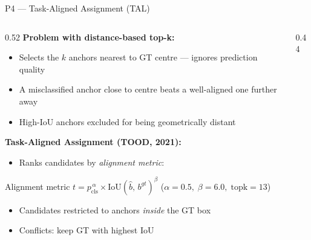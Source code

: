 \documentclass[aspectratio=169, 10pt]{beamer}
\begin{document}
\begin{frame}{P4 — Task-Aligned Assignment (TAL)}
  \begin{columns}[T]
    \begin{column}{0.52\textwidth}
      \textbf{Problem with distance-based top-k:}
      \begin{itemize}\small
        \item Selects the $k$ anchors nearest to GT centre — ignores prediction quality
        \item A misclassified anchor close to centre beats a well-aligned one further away
        \item High-IoU anchors excluded for being geometrically distant
      \end{itemize}

      \vspace{5pt}
      \textbf{Task-Aligned Assignment (TOOD, 2021):}
      \begin{itemize}\small
        \item Ranks candidates by \emph{alignment metric}:
      \end{itemize}
      \begin{block}{\small Alignment metric}
        \small
        $t = p_{\mathrm{cls}}^{\,\alpha} \times \mathrm{IoU}(\hat{b},\,b^{gt})^{\beta}$
        \;\scriptsize ($\alpha{=}0.5,\;\beta{=}6.0,\;\text{topk}{=}13$)
      \end{block}
      \begin{itemize}\small
        \item Candidates restricted to anchors \emph{inside} the GT box
        \item Conflicts: keep GT with highest IoU
      \end{itemize}
    \end{column}
    \begin{column}{0.44\textwidth}
      \vspace{4pt}
\end{column}
\end{columns}
\end{frame}
\end{document}
